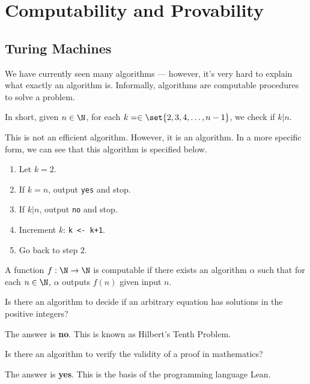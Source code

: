 \documentclass[10pt]{mypackage}
\begin{document}
\section{Computability and Provability}%
\subsection{Turing Machines}%
We have currently seen many algorithms --- however, it's very hard to explain what exactly an algorithm is. Informally, algorithms are computable procedures to solve a problem.
\begin{example}
  In short, given $n\in \N$, for each $k = \in \set{2,3,4,\dots,n-1}$, we check if $k | n$.\newline

  This is not an efficient algorithm. However, it is an algorithm. In a more specific form, we can see that this algorithm is specified below.
  \begin{enumerate}[(1)]
    \item Let $k = 2$.
    \item If $k = n$, output \texttt{yes} and stop.
    \item If $k | n$, output \texttt{no} and stop.
    \item Increment $k$: \texttt{k <- k+1}.
    \item Go back to step $2$.
  \end{enumerate}
\end{example}
\begin{definition}
  A function $f: \N\rightarrow \N$ is computable if there exists an algorithm $\alpha$ such that for each $n\in\N$, $\alpha$ outputs $f(n)$ given input $n$.
\end{definition}
\begin{question}
Is there an algorithm to decide if an arbitrary equation has solutions in the positive integers?
\end{question}
\begin{answer}
  The answer is \textbf{no}. This is known as Hilbert's Tenth Problem.
\end{answer}
\begin{question}
  Is there an algorithm to verify the validity of a proof in mathematics?
\end{question}
\begin{answer}
  The answer is \textbf{yes}. This is the basis of the programming language Lean.
\end{answer}
\end{document}
